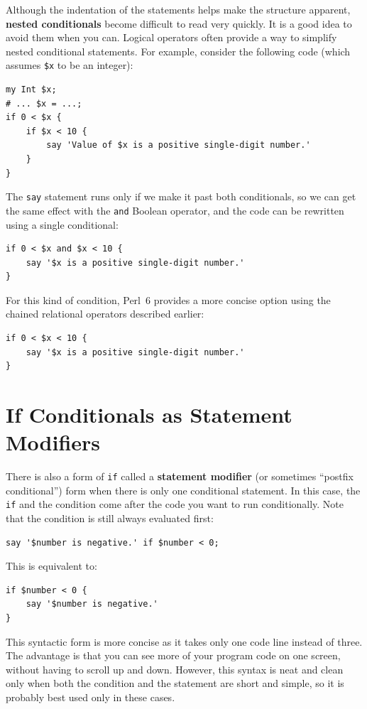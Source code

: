 Although the indentation of 
the statements helps make the structure apparent, 
{\bf nested conditionals} become difficult to read very 
quickly.  It is a good idea to avoid them when you can.
Logical operators often provide a way to simplify nested 
conditional statements.  For example, consider the 
following code (which assumes \verb'$x' to be an integer):

\begin{verbatim}
my Int $x;
# ... $x = ...;
if 0 < $x {
    if $x < 10 {
        say 'Value of $x is a positive single-digit number.'
    }
}
\end{verbatim}
%
The {\tt say} statement runs only if we make it past both
conditionals, so we can get the same effect with the {\tt and} 
Boolean operator, and the code can be rewritten using a 
single conditional:

\begin{verbatim}
if 0 < $x and $x < 10 {
    say '$x is a positive single-digit number.'
}
\end{verbatim}

For this kind of condition, Perl~6 provides a more concise 
option using the chained relational operators described earlier:

\begin{verbatim}
if 0 < $x < 10 {
    say '$x is a positive single-digit number.'
}
\end{verbatim}

\section{If Conditionals as Statement Modifiers}
 
 

There is also a form of {\tt if} called a {\bf statement 
modifier} (or sometimes  ``postfix conditional'') form when there is only 
one conditional statement. In this case, the {\tt if} and the 
condition come after the code you want to run conditionally. Note 
that the condition is still always evaluated first:

\begin{verbatim}
say '$number is negative.' if $number < 0;
\end{verbatim}
%
This is equivalent to:
\begin{verbatim}
if $number < 0 {
    say '$number is negative.' 
}
\end{verbatim}
%
This syntactic form is more concise as it takes only one code 
line instead of three. The advantage is that you can see more
of your program code on one screen, without having to scroll up 
and down. However, this syntax is neat and clean only when 
both the condition and the statement are short and simple, so it 
is probably best used only in these cases.

